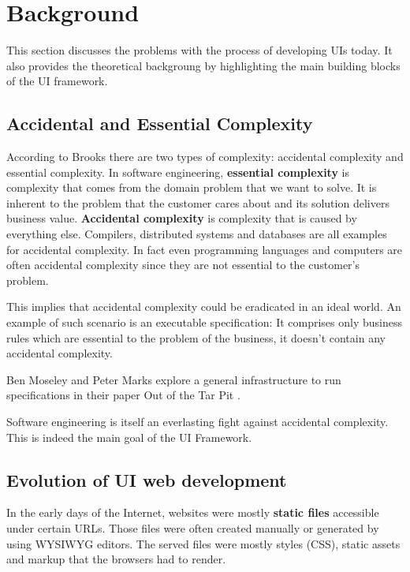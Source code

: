 \section{Background}\label{background}

This section discusses the problems with the process of developing UIs today. It also provides the theoretical backgroung by highlighting the main building blocks of the UI framework.

\subsection{Accidental and Essential Complexity}\label{history}

According to Brooks there are two types of complexity: accidental complexity and essential complexity. \citep{nosilverbullet}
In software engineering, \textbf{essential complexity} is complexity that comes from the domain problem that we want to solve. It is inherent to the problem that the customer cares about and its solution delivers business value. \textbf{Accidental complexity} is complexity that is caused by everything else. Compilers, distributed systems and databases are all examples for accidental complexity. In fact even programming languages and computers are often accidental complexity since they are not essential to the customer's problem.

This implies that accidental complexity could be eradicated in an ideal world. An example of such scenario is an executable specification: It comprises only business rules which are essential to the problem of the business, it doesn't contain any accidental complexity.

Ben Moseley and Peter Marks explore a general infrastructure to run specifications in their paper Out of the Tar Pit \citep{outoftarpit}.

Software engineering is itself an everlasting fight against accidental complexity. This is indeed the main goal of the UI Framework.

\subsection{Evolution of UI web development}\label{history}

In the early days of the Internet, websites were mostly \textbf{static files} accessible under certain URLs. Those files were often created manually or generated by using WYSIWYG editors. The served files were mostly styles (CSS), static assets and markup that the browsers had to render.

